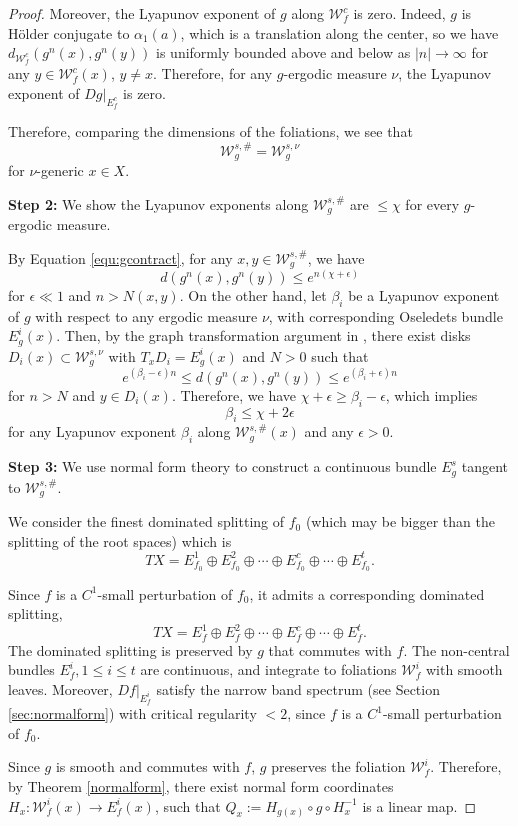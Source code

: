 \documentclass[11pt]{amsart}
\numberwithin{equation}{section}
\newcommand{\W}{\mathcal{W}}
\theoremstyle{plain}
\begin{document}
\begin{proof}
Moreover, the Lyapunov exponent of $g$ along $\W^c_f$ is zero. Indeed, $g$ is H\"older conjugate to $\alpha_1(a)$, which is a translation along the center, so we have $d_{\W^c_f}(g^n(x),g^n(y))$ is uniformly bounded above and below as $|n|\to \infty$ for any $y\in \W^c_f(x)$, $y\neq x$. Therefore, for any $g$-ergodic measure $\nu$, the Lyapunov exponent of $Dg|_{E^c_f}$ is zero.

Therefore, comparing the dimensions of the foliations, we see that 
$$\W^{s,\#}_g = \W^{s,\nu}_g$$
for $\nu$-generic $x\in X$.


\textbf{Step 2:} We show the Lyapunov exponents along $\W^{s,\#}_g$ are $\le \chi$ for every $g$-ergodic measure.

By Equation \ref{equ:gcontract}, for any $x, y \in \W^{s,\#}_g$, we have 
$$d(g^n(x), g^n(y)) \le e^{n(\chi+\epsilon)}$$ 
for $\epsilon \ll 1$ and $n > N(x,y)$. On the other hand, let $\beta_i$ be a Lyapunov exponent of $g$ with respect to any ergodic measure $\nu$, with corresponding Oseledets bundle $E^i_g(x)$. Then, by the graph transformation argument in \cite[Theorem 3.16]{PuShergo}, there exist disks $D_i(x) \subset \W^{s,\nu}_g$ with $T_x D_i = E^i_g(x)$ and $N > 0$ such that 
$$e^{(\beta_i-\epsilon)n} \le d(g^n(x), g^n(y)) \le e^{(\beta_i+\epsilon)n}$$ 
for $n > N$ and $y \in D_i(x)$. Therefore, we have $\chi + \epsilon \ge \beta_i - \epsilon$, which implies 
$$\beta_i \le \chi + 2\epsilon$$ 
for any Lyapunov exponent $\beta_i$ along $\W^{s,\#}_g(x)$ and any $\epsilon > 0$.


\textbf{Step 3:} We use normal form theory to construct a continuous bundle $E^s_g$ tangent to $\W^{s,\#}_g$.

We consider the finest dominated splitting of $f_0$ (which may be bigger than the splitting of the root spaces) which is $$TX=E^1_{f_0}\oplus E^2_{f_0}\oplus \cdots \oplus E^c_{f_0}\oplus \cdots \oplus E^t_{f_0}.$$

Since $f$ is a $C^1$-small perturbation of $f_0$, it admits a corresponding dominated splitting, $$TX=E^1_f\oplus E^2_f\oplus \cdots \oplus E^c_f\oplus \cdots \oplus E^t_f.$$ The dominated splitting is preserved by $g$ that commutes with $f$. The non-central bundles $E^i_f, 1\le i\le t$ are continuous, and integrate to foliations $\W^i_f$ with smooth leaves. Moreover, $Df|_{E^i_f}$ satisfy the narrow band spectrum (see Section \ref{sec:normalform}) with critical regularity $<2$, since $f$ is a $C^1$-small perturbation of $f_0$.

Since $g$ is smooth and commutes with $f$, $g$ preserves the foliation $\W^i_f$. Therefore, by Theorem \ref{normalform}, there exist normal form coordinates $H_x:\W^i_f(x)\to E^i_f(x)$, such that $Q_x:=H_{g(x)}\circ g\circ H^{-1}_x$ is a linear map.


\end{proof}
\end{document}
